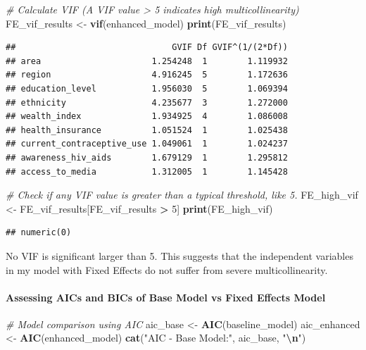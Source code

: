 \documentclass[
]{article}
\newenvironment{Shaded}{\begin{snugshade}}{\end{snugshade}}
\newcommand{\CommentTok}[1]{\textcolor[rgb]{0.56,0.35,0.01}{\textit{#1}}}
\newcommand{\DecValTok}[1]{\textcolor[rgb]{0.00,0.00,0.81}{#1}}
\newcommand{\FunctionTok}[1]{\textcolor[rgb]{0.13,0.29,0.53}{\textbf{#1}}}
\newcommand{\NormalTok}[1]{#1}
\newcommand{\OtherTok}[1]{\textcolor[rgb]{0.56,0.35,0.01}{#1}}
\newcommand{\SpecialCharTok}[1]{\textcolor[rgb]{0.81,0.36,0.00}{\textbf{#1}}}
\newcommand{\StringTok}[1]{\textcolor[rgb]{0.31,0.60,0.02}{#1}}
\begin{document}
\begin{Shaded}
\begin{Highlighting}[]
\CommentTok{\# Calculate VIF (A VIF value \textgreater{} 5 indicates high multicollinearity)}
\NormalTok{FE\_vif\_results }\OtherTok{\textless{}{-}} \FunctionTok{vif}\NormalTok{(enhanced\_model)}
\FunctionTok{print}\NormalTok{(FE\_vif\_results)}
\end{Highlighting}
\end{Shaded}

\begin{verbatim}
##                               GVIF Df GVIF^(1/(2*Df))
## area                      1.254248  1        1.119932
## region                    4.916245  5        1.172636
## education_level           1.956030  5        1.069394
## ethnicity                 4.235677  3        1.272000
## wealth_index              1.934925  4        1.086008
## health_insurance          1.051524  1        1.025438
## current_contraceptive_use 1.049061  1        1.024237
## awareness_hiv_aids        1.679129  1        1.295812
## access_to_media           1.312005  1        1.145428
\end{verbatim}

\begin{Shaded}
\begin{Highlighting}[]
\CommentTok{\# Check if any VIF value is greater than a typical threshold, like 5.}
\NormalTok{FE\_high\_vif }\OtherTok{\textless{}{-}}\NormalTok{ FE\_vif\_results[FE\_vif\_results }\SpecialCharTok{\textgreater{}} \DecValTok{5}\NormalTok{]}
\FunctionTok{print}\NormalTok{(FE\_high\_vif)}
\end{Highlighting}
\end{Shaded}

\begin{verbatim}
## numeric(0)
\end{verbatim}

No VIF is significant larger than 5. This suggests that the independent
variables in my model with Fixed Effects do not suffer from severe
multicollinearity.

\hypertarget{assessing-aics-and-bics-of-base-model-vs-fixed-effects-model}{%
\paragraph{Assessing AICs and BICs of Base Model vs Fixed Effects
Model}\label{assessing-aics-and-bics-of-base-model-vs-fixed-effects-model}}

\begin{Shaded}
\begin{Highlighting}[]
\CommentTok{\# Model comparison using AIC}
\NormalTok{aic\_base }\OtherTok{\textless{}{-}} \FunctionTok{AIC}\NormalTok{(baseline\_model)}
\NormalTok{aic\_enhanced }\OtherTok{\textless{}{-}} \FunctionTok{AIC}\NormalTok{(enhanced\_model)}
\FunctionTok{cat}\NormalTok{(}\StringTok{"AIC {-} Base Model:"}\NormalTok{, aic\_base, }\StringTok{"}\SpecialCharTok{\textbackslash{}n}\StringTok{"}\NormalTok{)}
\end{Highlighting}
\end{Shaded}
\end{document}
